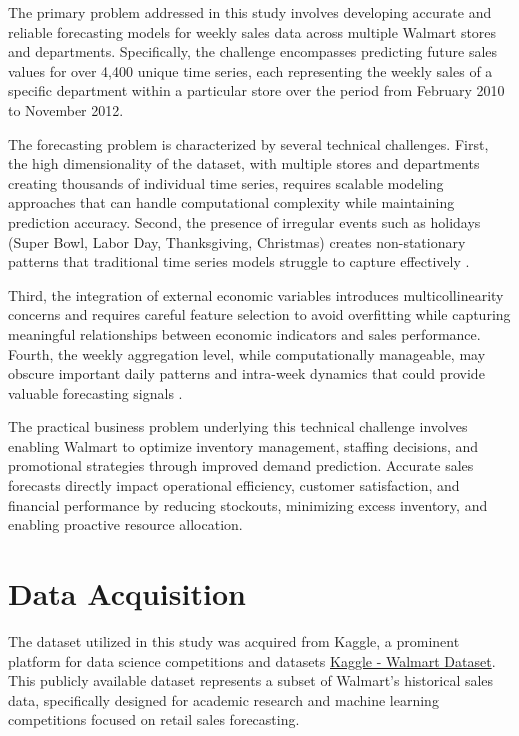 The primary problem addressed in this study involves developing accurate and reliable forecasting models for weekly sales data across multiple Walmart stores and departments. Specifically, the challenge encompasses predicting future sales values for over 4,400 unique time series, each representing the weekly sales of a specific department within a particular store over the period from February 2010 to November 2012.

The forecasting problem is characterized by several technical challenges. First, the high dimensionality of the dataset, with multiple stores and departments creating thousands of individual time series, requires scalable modeling approaches that can handle computational complexity while maintaining prediction accuracy. Second, the presence of irregular events such as holidays (Super Bowl, Labor Day, Thanksgiving, Christmas) creates non-stationary patterns that traditional time series models struggle to capture effectively \cite{Loyal:2017}.

Third, the integration of external economic variables introduces multicollinearity concerns and requires careful feature selection to avoid overfitting while capturing meaningful relationships between economic indicators and sales performance. Fourth, the weekly aggregation level, while computationally manageable, may obscure important daily patterns and intra-week dynamics that could provide valuable forecasting signals \cite{McElroy:2018}.

The practical business problem underlying this technical challenge involves enabling Walmart to optimize inventory management, staffing decisions, and promotional strategies through improved demand prediction. Accurate sales forecasts directly impact operational efficiency, customer satisfaction, and financial performance by reducing stockouts, minimizing excess inventory, and enabling proactive resource allocation.

\section{Data Acquisition}

The dataset utilized in this study was acquired from Kaggle, a prominent platform for data science competitions and datasets \href{https://www.kaggle.com/datasets/yasserh/walmart-dataset/data}{Kaggle - Walmart Dataset}. This publicly available dataset represents a subset of Walmart's historical sales data, specifically designed for academic research and machine learning competitions focused on retail sales forecasting.

